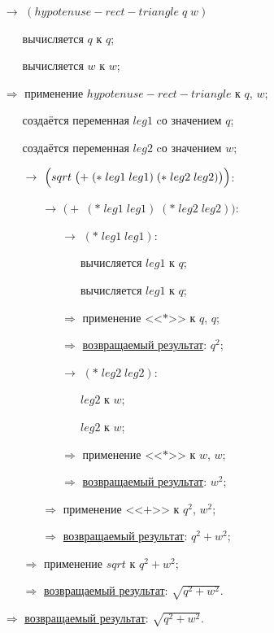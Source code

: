 \begin{itemize}
	\item[$\longrightarrow$] $(hypotenuse\!-\!rect\!-\!triangle\; q\; w)$
	\begin{itemize}
		\item[\textbullet] вычисляется $q$ к $q$;
		\item[\textbullet] вычисляется $w$ к $w$;
	\end{itemize}
	\item[$\Longrightarrow$] применение $hypotenuse\!-\!rect\!-\!triangle$ к $q$, $w$;
	\begin{itemize}
		\item[\textbullet] создаётся переменная $leg1$ cо значением $q$;
		\item[\textbullet] создаётся переменная $leg2$ cо значением $w$;
		\item[$\longrightarrow$] $\Bigl(sqrt\; \bigl(+\; (*\; leg1\; leg1)\; (*\; leg2\; leg2)\bigr)\Bigr)$:
		\begin{itemize}
			\item[$\longrightarrow$] $\bigl(+\; (*\; leg1\; leg1)\; (*\; leg2\; leg2)\bigr)$:
			\begin{enumerate}
				\item[$\longrightarrow$] $(*\; leg1\; leg1)$:
				\begin{enumerate}
					\item[\textbullet] вычисляется $leg1$ к $q$;
					\item[\textbullet] вычисляется $leg1$ к $q$;
				\end{enumerate}
				\item[$\Longrightarrow$] применение <<$*$>> к $q$, $q$;
				\item[$\Longrightarrow$] \underline{возвращаемый результат}: $q^2$;
				\item[$\longrightarrow$] $(*\; leg2\; leg2)$:
				\begin{enumerate}
					\item[\textbullet] $leg2$ к $w$;
					\item[\textbullet] $leg2$ к $w$;
				\end{enumerate}
				\item[$\Longrightarrow$] применение <<$*$>> к $w$, $w$;
				\item[$\Longrightarrow$] \underline{возвращаемый результат}: $w^2$;
			\end{enumerate}
			\item[$\Longrightarrow$] применение <<$+$>> к $q^2$, $w^2$;
			\item[$\Longrightarrow$] \underline{возвращаемый результат}: $q^2 + w^2$;
		\end{itemize}
		\item[$\Longrightarrow$] применение $sqrt$ к $q^2 + w^2$;
		\item[$\Longrightarrow$] \underline{возвращаемый результат}: $\sqrt{q^2 + w^2}$.
	\end{itemize}
	\item[$\Longrightarrow$] \underline{возвращаемый результат}: $\sqrt{q^2 + w^2}$.
\end{itemize}



